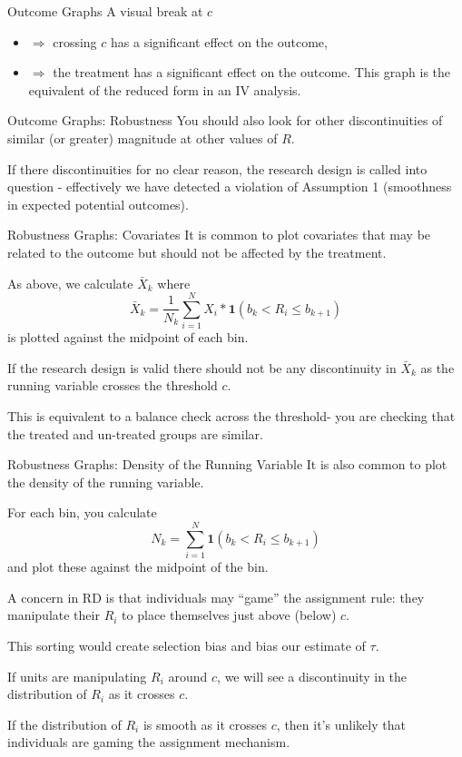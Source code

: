 \documentclass[
  ignorenonframetext,
]{beamer}
\begin{document}
\begin{frame}{Outcome Graphs}
\protect\hypertarget{outcome-graphs-1}{}
A visual break at \(c\)

\begin{itemize}
\item
  \(\Rightarrow\) crossing \(c\) has a significant effect on the
  outcome,
\item
  \(\Rightarrow\) the treatment has a significant effect on the outcome.
  This graph is the equivalent of the reduced form in an IV analysis.
\end{itemize}
\end{frame}

\begin{frame}{Outcome Graphs: Robustness}
\protect\hypertarget{outcome-graphs-robustness}{}
You should also look for other discontinuities of similar (or greater)
magnitude at other values of \(R\).

If there discontinuities for no clear reason, the research design is
called into question - effectively we have detected a violation of
Assumption 1 (smoothness in expected potential outcomes).
\end{frame}

\begin{frame}{Robustness Graphs: Covariates}
\protect\hypertarget{robustness-graphs-covariates}{}
It is common to plot covariates that may be related to the outcome but
should not be affected by the treatment.

As above, we calculate \(\bar{X}_k\) where \[
\bar{X}_k=\frac{1}{N_k}\sum_{i=1}^NX_i*\mathbf{1}(b_k<R_i\leq b_{k+1})
\] is plotted against the midpoint of each bin.

If the research design is valid there should not be any discontinuity in
\(\bar{X}_k\) as the running variable crosses the threshold \(c\).

This is equivalent to a balance check across the threshold- you are
checking that the treated and un-treated groups are similar.
\end{frame}

\begin{frame}{Robustness Graphs: Density of the Running Variable}
\protect\hypertarget{robustness-graphs-density-of-the-running-variable}{}
It is also common to plot the density of the running variable.

For each bin, you calculate \[
N_k=\sum_{i=1}^N\mathbf{1}(b_k<R_i\leq b_{k+1})
\] and plot these against the midpoint of the bin.

A concern in RD is that individuals may ``game'' the assignment rule:
they manipulate their \(R_i\) to place themselves just above (below)
\(c\).

This sorting would create selection bias and bias our estimate of
\(\tau\).

If units are manipulating \(R_i\) around \(c\), we will see a
discontinuity in the distribution of \(R_i\) as it crosses \(c\).

If the distribution of \(R_i\) is smooth as it crosses \(c\), then it's
unlikely that individuals are gaming the assignment mechanism.
\end{frame}
\end{document}
